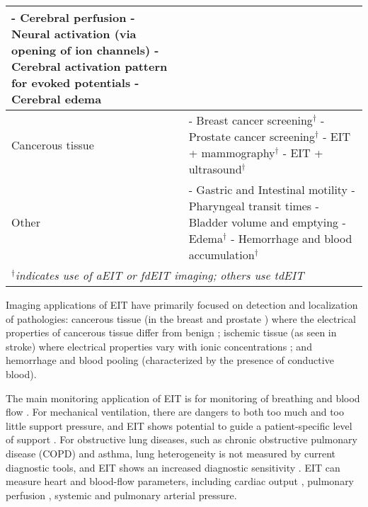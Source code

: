 \documentclass[10pt,journal]{IEEEtran}\def\TBLWIDA{15mm}\def\TBLWIDB{60mm}
\begin{document}
\begin{table}
\begin{tabular}{p{\TBLWIDA}p{\TBLWIDB}}
 - Cerebral perfusion \cite{Adler2017Cerebral}
          \newline
 - Neural activation (via opening of ion channels) \cite{Aristovich2014Neural}
          \newline
 - Cerebral activation pattern for evoked potentials
          \newline
 - Cerebral edema \cite{Holder1992Ischaemia}
\\
    \hline
Cancerous tissue &
 - Breast cancer screening$^\dagger$ \cite{Assenheimer2001TScan,Cherepenin2001Breast} 
      \newline
 - Prostate cancer screening$^\dagger$ \cite{Borsic2009Prostate, Halter2007Postate}
      \newline
 - EIT + mammography$^\dagger$ \cite{Choi2007Mammography}
      \newline
 - EIT + ultrasound$^\dagger$ \cite{Soleimani2006Ultrasound}
\\
    \hline
Other &
 - Gastric and Intestinal motility \cite{Mangnall1987}
       \newline
 - Pharyngeal transit times \cite{Mangnall1987}
       \newline
 - Bladder volume and emptying \cite{Leonhardt2011Bladder}
       \newline
 - Edema$^\dagger$ \cite{Abboud1995Peripheral, Newell1996}
       \newline
 - Hemorrhage and blood accumulation$^\dagger$ \cite{Sadleir2009blood}
  \\
  \multicolumn{2}{l}{\em%
      $^\dagger$indicates use of aEIT or fdEIT imaging;
      others use tdEIT
 }
\end{tabular}
\end{table}

Imaging applications of EIT have primarily focused on detection
and localization of pathologies: cancerous tissue (in the breast
\cite{Assenheimer2001TScan,Cherepenin2001Breast} and prostate
\cite{Borsic2009Prostate}) where the electrical properties of cancerous tissue
differ from benign \cite{Jossinet1998Breast}; ischemic tissue (as seen in
stroke) where electrical properties vary with ionic concentrations
\cite{Holder1992Ischaemia}; and hemorrhage and blood pooling (characterized by
the presence of conductive blood).

The main monitoring application of EIT is for monitoring of breathing
and blood flow
 \cite{Frerichs2017Chest}. For mechanical ventilation,
there are dangers to both too much and too little
support pressure, and EIT shows potential to guide a
patient-specific level of support \cite{Wolf2013Mechanical}.
For obstructive lung diseases, such as chronic obstructive pulmonary disease
(COPD) and asthma, lung heterogeneity 
is not measured by current diagnostic
tools, and EIT shows an increased diagnostic sensitivity
\cite{Vogt2016Heterogeneity}.
EIT can measure
heart and blood-flow parameters, including 
cardiac output \cite{vonkNoordegraaf2000},
pulmonary perfusion \cite{Frerichs2002Perfusion},
systemic \cite{Sola2011Central} and pulmonary
arterial \cite{Proenca2016Noninvasive} pressure.
\end{document}
